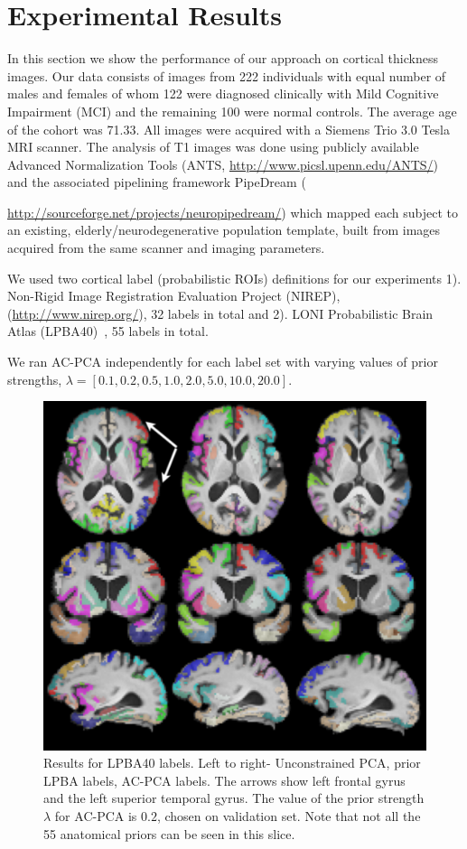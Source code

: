 \documentclass{llncs}
\begin{document}
\section{Experimental Results}
In this section we show the performance of our approach on cortical thickness images. Our data consists of images from 222 individuals with equal number of males and females of whom 122 were diagnosed clinically with Mild Cognitive Impairment (MCI) and the remaining 100 were normal controls. The average age of the cohort was 71.33. %
All images were acquired with a Siemens Trio 3.0 Tesla MRI scanner. The analysis of T1 images was done using publicly available Advanced Normalization Tools (ANTS, \url{http://www.picsl.upenn.edu/ANTS/}) and the associated pipelining framework PipeDream ({\url{http://sourceforge.net/projects/neuropipedream/}) which mapped each subject to an existing, elderly/neurodegenerative population template, built from images acquired from the same scanner and imaging parameters.

We used two cortical label (probabilistic ROIs) definitions for our experiments 1). Non-Rigid Image Registration Evaluation Project (NIREP),  (\url{http://www.nirep.org/}), 32 labels in total and  2). LONI Probabilistic Brain Atlas (LPBA40)~\cite{lpba}, 55 labels in total.


We ran AC-PCA independently for each label set with varying values of prior strengths, $\lambda =[0.1,0.2,0.5,1.0,2.0,5.0,10.0,20.0]$.


\begin{figure}
\begin{center}
\includegraphics[width=0.7\linewidth]{lpba.pdf} 
\end{center}
\vspace{-0.2in}
\caption{Results for LPBA40 labels. Left to right- Unconstrained PCA, prior LPBA labels, AC-PCA labels. The arrows show left frontal gyrus and the left superior temporal gyrus. The value of the prior strength $\lambda$ for AC-PCA is $0.2$, chosen on validation set. Note that not all the 55 anatomical priors can be seen in this slice.}
\label{fig:priorlpba}
\end{figure}


}
\end{document}
